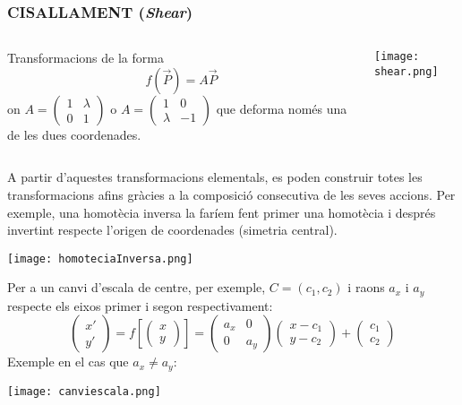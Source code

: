 \documentclass{beamer}
\begin{document}
\begin{frame}
  \frametitle{CISALLAMENT ({\it Shear})}
  \begin{columns}
    \begin{column}{0.5\textwidth}
      \begin{definicio}
        Transformacions de la forma
        \[
        f(\overrightarrow{P})=A \overrightarrow{P}
        \]
        on
        $A = \begin{pmatrix}1&\lambda\\0&1\end{pmatrix}$ o $A = \begin{pmatrix}1&0\\\lambda&-1\end{pmatrix}$
        que deforma només una de les dues coordenades.
      \end{definicio}
    \end{column}
    \begin{column}{0.5\textwidth}
      \begin{center}
        \texttt{[image: shear.png]}
      \end{center}
    \end{column}
  \end{columns}
\end{frame}

\begin{frame}
  A partir d'aquestes transformacions elementals, es poden construir totes les transformacions afins gràcies a la composició consecutiva de les seves accions. Per exemple, una homotècia inversa la faríem fent primer una homotècia i després invertint respecte l'origen de coordenades (simetria central).
  \begin{center}
    \texttt{[image: homoteciaInversa.png]}
  \end{center}
\end{frame}

\begin{frame}
  Per a un canvi d'escala de centre, per exemple, $C=(c_1,c_2)$ i raons $a_x$ i $a_y$ respecte els eixos primer i segon respectivament:
  \[
    \begin{pmatrix} x'\\y' \end{pmatrix}=
      f \left[ \begin{pmatrix} x\\y \end{pmatrix} \right]=
      \begin{pmatrix}a_x&0\\0&a_y\end{pmatrix}
      \begin{pmatrix}x-c_1\\y-c_2\end{pmatrix} +
      \begin{pmatrix}c_1\\c_2\end{pmatrix}
  \]
  Exemple en el cas que $a_x \neq a_y$:
  \begin{center}
    \texttt{[image: canviescala.png]}
  \end{center}
\end{frame}
\end{document}
